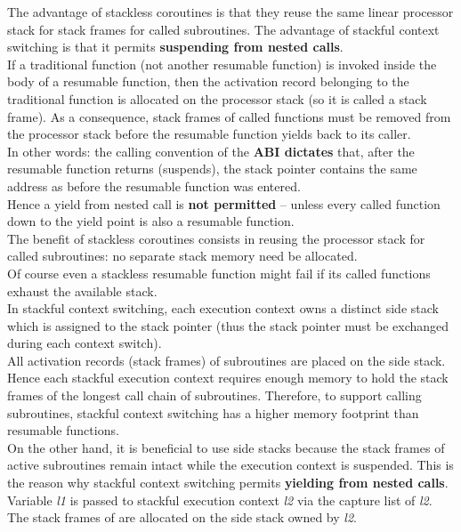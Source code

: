 The advantage of stackless coroutines is that they reuse the same linear
processor stack for stack frames for called subroutines. The advantage of
stackful context switching is that it permits {\bfseries suspending from
nested calls}.\\
\newline
If a traditional function (not another resumable function) is invoked inside
the body of a resumable function, then the activation record belonging to the
traditional function is allocated on the processor stack (so it is called a
stack frame). As a consequence, stack frames of called functions must be
removed from the processor stack before the resumable function yields back to
its caller.\\
In other words: the calling convention of the {\bfseries ABI dictates} that,
after the resumable function returns (suspends), the stack pointer contains the
same address as before the resumable function was entered.\\
Hence a yield from nested call is {\bfseries not permitted} -- unless every
called function down to the yield point is also a resumable function.\\
The benefit of stackless coroutines consists in reusing the processor stack
for called subroutines: no separate stack memory need be allocated.\\
\newline
Of course even a stackless resumable function might fail if its called
functions exhaust the available stack.\\
\newline
In stackful context switching, each execution context owns a
distinct side stack which is assigned to the stack pointer (thus the stack
pointer must be exchanged during each context switch).\\
All activation records (stack frames) of subroutines are placed on the side
stack. Hence each stackful execution context requires enough memory to hold
the stack frames of the longest call chain of subroutines. Therefore, to
support calling subroutines, stackful context switching has a higher memory
footprint than resumable functions.\\
On the other hand, it is beneficial to use side stacks because the stack
frames of active subroutines remain intact while the execution context is
suspended. This is the reason why stackful context switching permits
{\bfseries yielding from nested calls}.
Variable \emph{l1} is passed to stackful execution context \emph{l2} via
the capture list of \emph{l2}. The stack frames of  are
allocated on the side stack owned by \emph{l2}.

